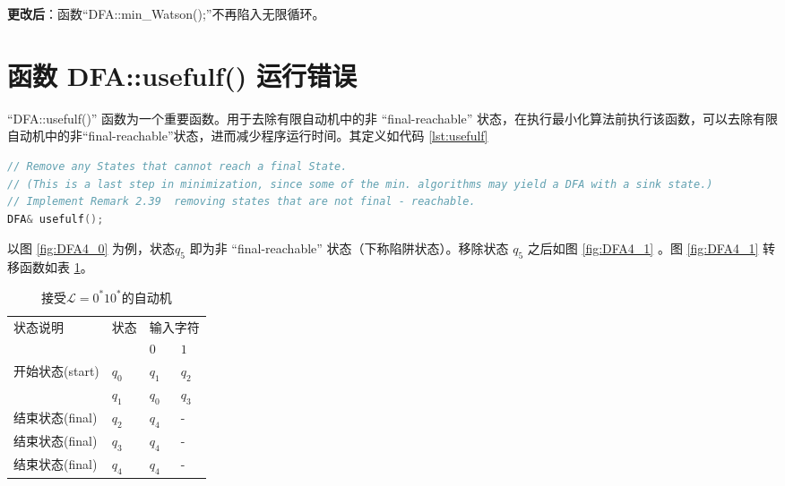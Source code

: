 {\bfseries 更改后}：函数“DFA::min\_Watson();”不再陷入无限循环。


\section{函数 DFA::usefulf() 运行错误}\label{sec:usefulf}

“DFA::usefulf()” 函数为一个重要函数。用于去除有限自动机中的非 “final-reachable” 状态，在执行最小化算法前执行该函数，可以去除有限自动机中的非“final-reachable”状态，进而减少程序运行时间。其定义如代码 \ref{lst:usefulf}
\lstset{style=mystyle}
\begin{lstlisting}[language=C++,label={lst:usefulf},caption={DFA::usefulf()}]
// Remove any States that cannot reach a final State.
// (This is a last step in minimization, since some of the min. algorithms may yield a DFA with a sink state.)
// Implement Remark 2.39  removing states that are not final - reachable.
DFA& usefulf();
\end{lstlisting}
以图 \ref{fig:DFA4_0} 为例，状态$q_5$ 即为非 “final-reachable” 状态（下称陷阱状态）。移除状态 $q_5$ 之后如图 \ref{fig:DFA4_1} 。图 \ref{fig:DFA4_1} 转移函数如表 \ref{tab:DFA4_1}。

\begin{table}[!htbp]
    \caption{接受{$\mathcal{L}=0^*10^*$}的自动机{\cite{book1}}}
    \label{tab:DFA4_1}
    \centering
    \small%
    \setlength{\tabcolsep}{4pt}%
    \renewcommand{\arraystretch}{1.2}%
        \begin{tabular}{l p{4em}<{\centering} p{3em}<{\centering} p{3em}<{\centering}}
        \toprule %
        \multirow{2}{*}{状态说明} & \multirow{2}{*}{状态} & \multicolumn{2}{c}{输入字符} \\
		\cline{3-4}      &    &$0$ & $1$  \\
        \midrule%
        开始状态(start)  & $q_0$ & $q_1$   & $q_2$   \\
                        & $q_1$ & $q_0$   & $q_3$   \\
        结束状态(final) & $q_2$ & $q_4$   & -   \\
        结束状态(final) & $q_3$ & $q_4$   & -   \\
        结束状态(final) & $q_4$ & $q_4$   & -   \\
        \bottomrule%
    \end{tabular}
\end{table}

